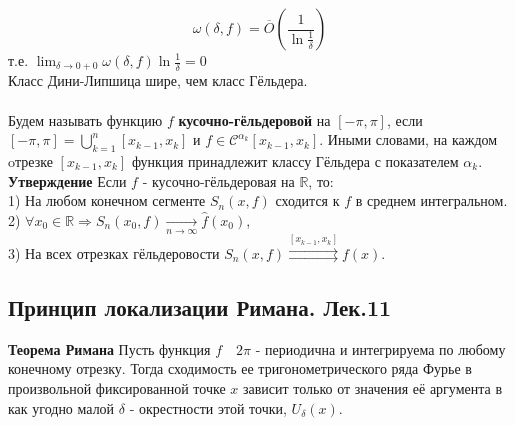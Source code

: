 \documentclass{article}
\begin{document}
	\begin{equation}
	\omega(\delta, f)=\overline{O}\left(\frac{1}{\ln\frac{1}{\delta}}\right)
	\end{equation}
	т.е. $\lim_{\delta \rightarrow 0+0} \omega(\delta,f)\ln\frac{1}{\delta}=0$\\
	Класс Дини-Липшица шире, чем класс Гёльдера.\\ 
	\\
	Будем называть функцию $ f $ \textbf{кусочно-гёльдеровой} на $ [-\pi, \pi]$,  если $ [-\pi, \pi]=\bigcup_{k=1}^{n}\left[x_{k-1}, x_{k}\right] $ и $ f \in \mathcal{C}^{\alpha_{k}}\left[x_{k-1}, x_{k}\right] $. Иными словами, на каждом oтрезке $ \left[x_{k-1}, x_{k}\right] $ функция принадлежит классу Гёльдера с показателем  $\alpha_{k}$.\\ 
	\textbf{Утверждение} Если $f$ - кусочно-гёльдеровая на  $\mathbb{R}$, то:\\
	1) На любом конечном сегменте $ S_{n}(x, f) $ сходится к $ f $ в среднем интегральном.\\
	2) $\forall x_{0} \in \mathbb{R} \Rightarrow S_{n}\left(x_{0}, f\right) \underset{n \rightarrow \infty}{\rightarrow}\widehat{f}\left(x_{0}\right)$,\\ 
	3) На всех отрезках гёльдеровости $ S_{n}(x, f) \stackrel{\left[x_{k-1}, x_{k}\right]}{\rightrightarrows} f(x) $.\\

\subsection{Принцип локализации Римана. Лек.11}
	\textbf{Теорема Римана} Пусть функция $ f \quad 2\pi$ - периодична и интегрируема по любому конечному отрезку. Тогда сходимость ее тригонометрического ряда Фурье в произвольной фиксированной точке $ x $ зависит только от значения её аргумента в как угодно малой $\delta$ - окрестности этой точки, ${U}_{\delta}(x)$.\\
\end{document}
